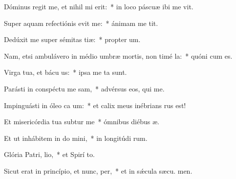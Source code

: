 \item Dóminus regit me, et nihil mi erit:~* in loco páscuæ ibi me vit.
\item Super aquam refectiónis evit me:~* ánimam me tit.
\item Dedúxit me super sémitas tiæ:~* propter  um.
\item Nam, etsi ambulávero in médio umbræ mortis, non timé la:~* quóni  cum es.
\item Virga tua, et bácu us:~* ipsa me ta sunt.
\item Parásti in conspéctu me sam,~* advérsus eos, qui  me.
\item Impinguásti in óleo ca um:~* et calix meus inébrians  rus est!
\item Et misericórdia tua subtur me~* ómnibus diébus  æ.
\item Et ut inhábitem in do mini,~* in longitúdi rum.
\item Glória Patri,  lio,~* et Spirí to.
\item Sicut erat in princípio, et nunc,  per,~* et in sǽcula sæcu. men.

